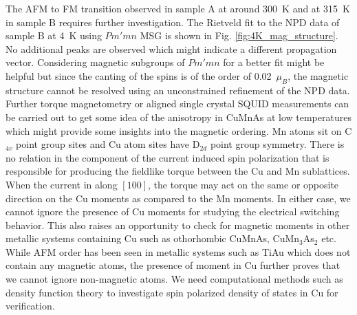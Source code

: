 \documentclass[10pt,doublespacing,edeposit]{uiucthesis2020}
\begin{document}
\begin{mainmatter}

The AFM to FM transition observed in sample A at around 300~K and at 315~K in sample B requires further investigation. The Rietveld fit to the NPD data of sample B at 4~K using $Pm'mn$ MSG is shown in Fig. \ref{fig:4K_mag_structure}. No additional peaks are observed which might indicate a different propagation vector. Considering magnetic subgroups of $Pm'mn$ for a better fit might be helpful but since the canting of the spins is of the order of 0.02~$\mu_B$, the magnetic structure cannot be resolved using an unconstrained refinement of the NPD data. Further torque magnetometry or aligned single crystal SQUID measurements can be carried out to get some idea of the anisotropy in CuMnAs at low temperatures which might provide some insights into the magnetic ordering. Mn atoms sit on C$_{4v}$ point group sites and Cu atom sites have D$_{2d}$ point group symmetry. There is no relation in the component of the current induced spin polarization that is responsible for producing the fieldlike torque between the Cu and Mn sublattices. When the current in along $[100]$, the torque may act on the same or opposite direction on the Cu moments as compared to the Mn moments. In either case, we cannot ignore the presence of Cu moments for studying the electrical switching behavior. This also raises an opportunity to check for magnetic moments in other metallic systems containing Cu such as othorhombic CuMnAs, CuMn$_3$As$_2$ etc. While AFM order has been seen in metallic systems such as TiAu \cite{Svanidze2015} which does not contain any magnetic atoms, the presence of moment in Cu further proves that we cannot ignore non-magnetic atoms. We need computational methods such as density function theory to investigate spin polarized density of states in Cu for verification.


\end{mainmatter}
\end{document}
